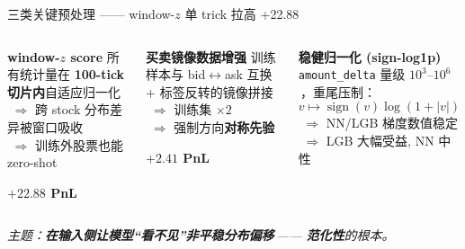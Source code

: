 \documentclass[aspectratio=169,11pt]{beamer}
\newcommand{\hl}[1]{\textcolor{lblue}{\textbf{#1}}}
\newcommand{\rhl}[1]{\textcolor{accred}{\textbf{#1}}}
\begin{document}
\begin{frame}{三类关键预处理 —— window-$z$ 单 trick 拉高 +22.88}
  \begin{columns}[T,onlytextwidth]
    \begin{block}{\hl{window-$z$ score}}
      \scriptsize
      所有统计量在 \textbf{100-tick 切片内}自适应归一化\\[2pt]
      \,\,$\Rightarrow$ 跨 stock 分布差异被窗口吸收\\[2pt]
      \,\,$\Rightarrow$ 训练外股票也能 zero-shot
      \begin{center}
        \vspace{2pt}
        \rhl{$+22.88$ PnL}
      \end{center}
    \end{block}
    \begin{block}{\hl{买卖镜像数据增强}}
      \scriptsize
      训练样本与 bid$\leftrightarrow$ask 互换 $+$ 标签反转的镜像拼接\\[2pt]
      \,\,$\Rightarrow$ 训练集 $\times 2$\\[2pt]
      \,\,$\Rightarrow$ 强制方向\textbf{对称先验}
      \begin{center}
        \vspace{6pt}
        \rhl{$+2.41$ PnL}
      \end{center}
    \end{block}
    \begin{block}{\hl{稳健归一化 (sign-log1p)}}
      \scriptsize
      \texttt{amount\_delta} 量级 $10^3$--$10^6$\,，重尾压制：
      \[
        v\mapsto\operatorname{sign}(v)\log(1{+}|v|)
      \]
      \,\,$\Rightarrow$ NN/LGB 梯度数值稳定\\[3pt]
      \,\,$\Rightarrow$ LGB 大幅受益, NN 中性
    \end{block}
  \end{columns}
  \vspace{6pt}
  \begin{center}
    \footnotesize\itshape
    主题：\textbf{在输入侧让模型``看不见''非平稳分布偏移}\,—— \hl{范化性}的根本。
  \end{center}
\end{frame}
\end{document}
